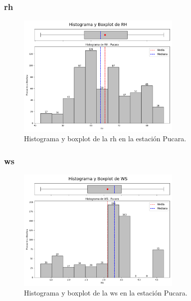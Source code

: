 \subsubsection*{\gls{rh} }
\begin{figure}[htbp]
\centering
\includegraphics[width=0.7\textwidth]{resultados/por_estacion_meteorologica/Pucara/RH_histograma.png}
\caption{Histograma y boxplot de la \gls{rh}  en la estación Pucara.}
\label{fig:pucara_RH}
\end{figure}

\subsubsection*{\gls{ws} }
\begin{figure}[htbp]
\centering
\includegraphics[width=0.7\textwidth]{resultados/por_estacion_meteorologica/Pucara/WS_histograma.png}
\caption{Histograma y boxplot de la \gls{ws}  en la estación Pucara.}
\label{fig:pucara_WS}
\end{figure}

